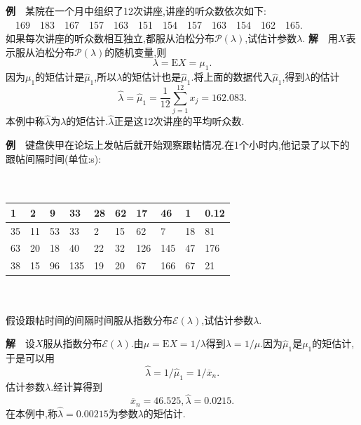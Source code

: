 	\begin{frame}
		\textbf{例}$\quad$某院在一个月中组织了12次讲座,讲座的听众数依次如下:\\
		$\quad$169$\quad$183$\quad$167$\quad$157$\quad$163$\quad$151$\quad$154$\quad$157$\quad$163$\quad$154$\quad$162$\quad$165.\\
		如果每次讲座的听众数相互独立,都服从泊松分布$\mathcal{P}(\lambda)$,试估计参数$\lambda$.
		\textbf{解}$\quad$用$X$表示服从泊松分布$\mathcal{P}(\lambda)$的随机变量,则
		\begin{equation}
			\lambda = \mathrm{E}X = \mu_1.
		\end{equation}
		因为$\mu_1$的矩估计是$\widehat{\mu}_1$,所以$\lambda$的矩估计也是$\widehat{\mu}_1$.将上面的数据代入$\widehat{\mu}_1$,得到$\lambda$的估计
		\begin{equation}
			\widehat{\lambda} = \widehat{\mu}_1 = \frac{1}{12}\sum_{j=1}^{12}x_j = 162.083.
		\end{equation}
		本例中称$\widehat{\lambda}$为$\lambda$的矩估计.$\widehat{\lambda}$正是这12次讲座的平均听众数.
	\end{frame}

	\begin{frame}
		\textbf{例}$\quad$键盘侠甲在论坛上发帖后就开始观察跟帖情况.在1个小时内,他记录了以下的跟帖间隔时间(单位:s):
		\\ \hspace*{\fill} \\%
		$\quad$\begin{tabular}{|l|l|l|l|l|l|l|l|l|l|}
			\hline 1 & 2 & 9 & 33 & 28 & 62 & 17 & 46 & 1 & 0.12 \\
			\hline 35 & 11 & 53 & 33 & 2 & 15 & 62 & 7 & 18 & 81 \\
			\hline 63 & 20 & 18 & 40 & 22 & 32 & 126 & 145 & 47 & 176 \\
			\hline 38 & 15 & 96 & 135 & 19 & 20 & 67 & 166 & 67 & 21 \\
			\hline
		\end{tabular}
		\\ \hspace*{\fill} \\%
		假设跟帖时间的间隔时间服从指数分布$\mathcal{E}(\lambda)$,试估计参数$\lambda$.
		
		\textbf{解}$\quad$设$X$服从指数分布$\mathcal{E}(\lambda)$.由$\mu = \mathrm{E}X = 1/\lambda$得到$\lambda = 1/\mu$.因为$\widehat{\mu}_1$是$\mu_1$的矩估计,于是可以用
		\begin{equation}
			\widehat{\lambda} = 1/\widehat{\mu}_1 = 1/\overline{x}_n.
		\end{equation}
		估计参数$\lambda$.经计算得到
		\begin{equation}
			\overline{x}_n = 46.525,\widehat{\lambda} = 0.0215.
		\end{equation}
		在本例中,称$\widehat{\lambda} = 0.00215$为参数$\lambda$的矩估计.
	\end{frame}

